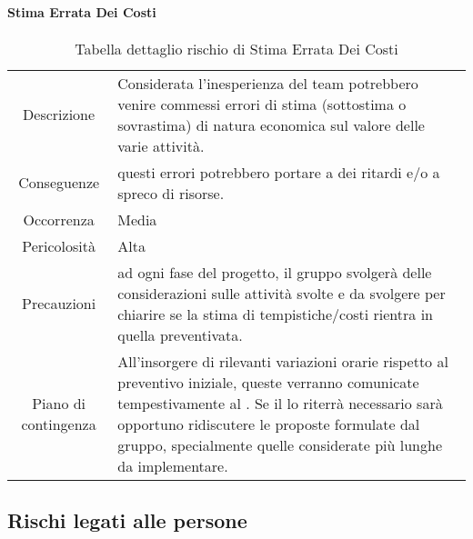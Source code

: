 \paragraph*{Stima Errata Dei Costi}
\renewcommand{\arraystretch}{1}
    \begin{table}[H]
        \begin{center}
            \setlength{\aboverulesep}{0pt}
            \setlength{\belowrulesep}{0pt}
            \setlength{\extrarowheight}{.75ex}
            \begin{tabular}{ c p{10cm} }
                \rowcolor{AzzurroGruppo!30} 
                \toprule
                Descrizione & Considerata l'inesperienza del team potrebbero venire commessi errori di stima (sottostima o sovrastima) di natura economica sul valore delle varie attività. \\
                Conseguenze & questi errori potrebbero portare a dei ritardi e/o a spreco di risorse. \\
                Occorrenza & Media \\
                Pericolosità & Alta \\
                Precauzioni & ad ogni fase del progetto, il gruppo svolgerà delle considerazioni sulle attività svolte e da svolgere per chiarire se la stima di tempistiche/costi rientra in quella preventivata. \\
                Piano di contingenza & All’insorgere di rilevanti variazioni orarie rispetto al preventivo iniziale, queste verranno comunicate tempestivamente al \proponente{}. \newline Se il \proponente{} lo riterrà necessario sarà opportuno ridiscutere le proposte formulate dal gruppo, specialmente quelle considerate più lunghe da implementare. \\
                \bottomrule
            \end{tabular}
            \caption{Tabella dettaglio rischio di Stima Errata Dei Costi}
        \end{center}
    \end{table}

\subsection{Rischi legati alle persone}

